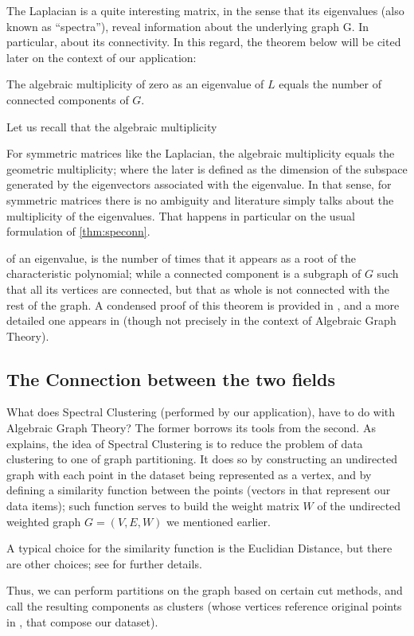 The Laplacian is a quite interesting matrix, in the sense that its
eigenvalues (also known as ``spectra''), reveal information about the
underlying graph G. In particular, about its connectivity. In this
regard, the theorem below will be cited later on the context of our
application: 

\begin{theorem}
  \label{thm:speconn}
  The algebraic multiplicity of zero as an eigenvalue of $L$ equals
  the number of connected components of $G$.
\end{theorem}
\hfill

Let us recall that the algebraic multiplicity \begin{footnote}For
  symmetric matrices like the Laplacian, the algebraic multiplicity
  equals the geometric multiplicity; where the later is defined as the
  dimension of the subspace generated by the eigenvectors associated
  with the eigenvalue. In that sense, for symmetric matrices there is
  no ambiguity and literature simply talks about the multiplicity of
  the eigenvalues. That happens in particular on the usual formulation
  of \cref{thm:speconn}.
  \end{footnote} of an eigenvalue, is the
number of times that it appears as a root of the characteristic
polynomial; while a connected component is a subgraph of
$G$ such that all its vertices are connected, but that as whole is not
connected with the rest of the graph. 
A condensed proof of this theorem is provided in
\cite{brouwer}, and a more detailed one appears in \cite{luxburg07}
(though not precisely in the context of Algebraic Graph Theory). \\

\subsection{The Connection between the two fields}

What does Spectral Clustering (performed by our application), have to
do with Algebraic Graph Theory? The former borrows its tools from the
second. As \cite{jia14} explains, the idea of Spectral Clustering is
to reduce the problem of data clustering to one of graph
partitioning. It does so by constructing an undirected graph with each
point in the dataset being represented as a vertex, and by defining a
similarity function 
between the points (vectors in  that represent our data items); such
function serves to build the weight matrix $W$ of the undirected weighted graph
$G = (V,E,W)$ we mentioned earlier. \begin{footnote}A typical choice
  for the similarity function is the Euclidian Distance, but there are
  other choices; see \cite{luxburg07} for further
  details.\end{footnote} Thus, we can perform partitions on the graph
based on certain cut methods, and call the resulting components as
clusters (whose vertices reference original points in , that
compose our dataset). \\

